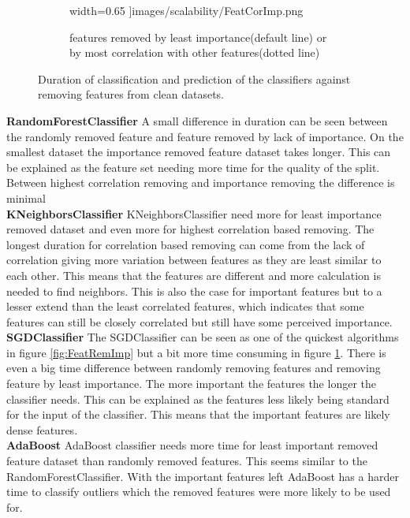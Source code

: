 \documentclass[a4paper,10pt]{article}
\begin{document}
\begin{figure}[H]
\begin{subfigure}[b]{0.45\textwidth}
		width=0.65\textwidth
		]{images/scalability/FeatCorImp.png}
		\caption{features removed by least importance(default line) or by most correlation with other features(dotted line)}
		\label{fig:FeatCorImp}
	\end{subfigure}
	
	\caption{Duration of classification and prediction of the classifiers against removing features from clean datasets.}
	\label{fig:FeatRem}
\end{figure}

\textbf{RandomForestClassifier} A small difference in duration can be seen between the randomly removed feature and feature removed by lack of importance. On the smallest dataset the importance removed feature dataset takes longer. This can be explained as the feature set needing more time for the quality of the split. Between highest correlation removing and importance removing the difference is minimal\\

\textbf{KNeighborsClassifier} KNeighborsClassifier need more for least importance removed dataset and even more for highest correlation based removing. The longest duration for correlation based removing can come from the lack of correlation giving more variation between features as they are least similar to each other. This means that the features are different and more calculation is needed to find neighbors. This is also the case for important features but to a lesser extend than the least correlated features, which indicates that some features can still be closely correlated but still have some perceived importance.\\

\textbf{SGDClassifier} The SGDClassifier can be seen as one of the quickest algorithms in figure \ref{fig:FeatRemImp} but a bit more time consuming in figure \ref{fig:FeatCorImp}. There is even a big time difference between randomly removing features and removing feature by least importance. The more important the features the longer the classifier needs. This can be explained as the features less likely being standard for the input of the classifier. This means that the important features are likely dense features. \\

\textbf{AdaBoost} AdaBoost classifier needs more time for least important removed feature dataset than randomly removed features. This seems similar to the RandomForestClassifier. With the important features left AdaBoost has a harder time to classify outliers which the removed features were more likely to be used for. \\
\end{document}
